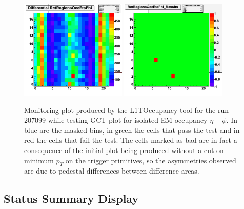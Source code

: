 \begin{figure}[!htb]
\centering
\includegraphics[width=0.45\textwidth]{Chapter03/L1TOnline/Images/L1TOccupancy_Diff.png}
\includegraphics[width=0.45\textwidth]{Chapter03/L1TOnline/Images/L1TOccupancy_Results.png}
\caption{Monitoring plot produced by the L1TOccupancy tool for the run 207099 while testing GCT plot for isolated
EM occupancy $\eta-\phi$. In blue are the masked bins, in green the cells that pass the test and in red the cells
that fail the test. The cells marked as bad are in fact a consequence of the initial plot being produced without
a cut on minimum $p_T$ on the trigger primitives, so the asymmetries observed are due to pedestal differences between
difference areas.}
\label{figure_ServiceWork_L1TOccupancy}
\end{figure}

\subsection{Status Summary Display}

